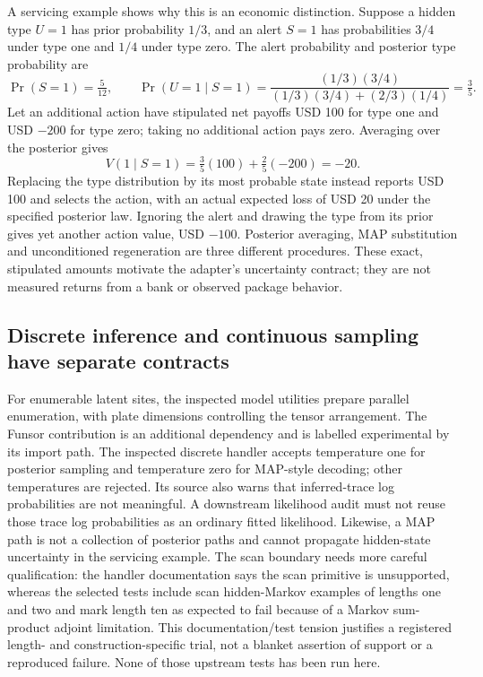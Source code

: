 A servicing example shows why this is an economic distinction. Suppose a hidden type $U=1$ has prior probability $1/3$, and an alert $S=1$ has probabilities $3/4$ under type one and $1/4$ under type zero. The alert probability and posterior type probability are
\begin{equation}
 \Pr(S=1)=\tfrac{5}{12},\qquad
 \Pr(U=1\mid S=1)=
 \frac{(1/3)(3/4)}{(1/3)(3/4)+(2/3)(1/4)}=\tfrac35.
\end{equation}
Let an additional action have stipulated net payoffs USD 100 for type one and USD $-200$ for type zero; taking no additional action pays zero. Averaging over the posterior gives
\begin{equation}
 V(1\mid S=1)=\tfrac35(100)+\tfrac25(-200)=-20.
\end{equation}
Replacing the type distribution by its most probable state instead reports USD 100 and selects the action, with an actual expected loss of USD 20 under the specified posterior law. Ignoring the alert and drawing the type from its prior gives yet another action value, USD $-100$. Posterior averaging, MAP substitution and unconditioned regeneration are three different procedures. These exact, stipulated amounts motivate the adapter's uncertainty contract; they are not measured returns from a bank or observed package behavior. \cite{exec23_numpyro_reference}

\subsection{Discrete inference and continuous sampling have separate contracts}

For enumerable latent sites, the inspected model utilities prepare parallel enumeration, with plate dimensions controlling the tensor arrangement. The Funsor contribution is an additional dependency and is labelled experimental by its import path. The inspected discrete handler accepts temperature one for posterior sampling and temperature zero for MAP-style decoding; other temperatures are rejected. Its source also warns that inferred-trace log probabilities are not meaningful. A downstream likelihood audit must not reuse those trace log probabilities as an ordinary fitted likelihood. Likewise, a MAP path is not a collection of posterior paths and cannot propagate hidden-state uncertainty in the servicing example. The scan boundary needs more careful qualification: the handler documentation says the scan primitive is unsupported, whereas the selected tests include scan hidden-Markov examples of lengths one and two and mark length ten as expected to fail because of a Markov sum-product adjoint limitation. This documentation/test tension justifies a registered length- and construction-specific trial, not a blanket assertion of support or a reproduced failure. None of those upstream tests has been run here. \cite{exec23_numpyro_sources}

